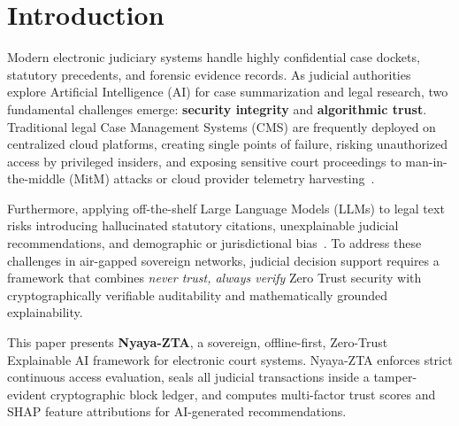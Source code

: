 \documentclass[10pt,conference,two-column]{IEEEtran}
\begin{document}
\section{Introduction}
Modern electronic judiciary systems handle highly confidential case dockets, statutory precedents, and forensic evidence records. As judicial authorities explore Artificial Intelligence (AI) for case summarization and legal research, two fundamental challenges emerge: \textbf{security integrity} and \textbf{algorithmic trust}. Traditional legal Case Management Systems (CMS) are frequently deployed on centralized cloud platforms, creating single points of failure, risking unauthorized access by privileged insiders, and exposing sensitive court proceedings to man-in-the-middle (MitM) attacks or cloud provider telemetry harvesting~\cite{kindervag2010build, rose2020zero}.

Furthermore, applying off-the-shelf Large Language Models (LLMs) to legal text risks introducing hallucinated statutory citations, unexplainable judicial recommendations, and demographic or jurisdictional bias~\cite{surden2014machine, aletras2016predicting}. To address these challenges in air-gapped sovereign networks, judicial decision support requires a framework that combines \emph{never trust, always verify} Zero Trust security with cryptographically verifiable auditability and mathematically grounded explainability.

This paper presents \textbf{Nyaya-ZTA}, a sovereign, offline-first, Zero-Trust Explainable AI framework for electronic court systems. Nyaya-ZTA enforces strict continuous access evaluation, seals all judicial transactions inside a tamper-evident cryptographic block ledger, and computes multi-factor trust scores and SHAP feature attributions for AI-generated recommendations.
\end{document}
